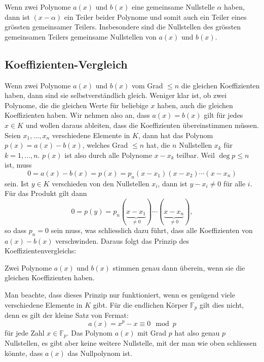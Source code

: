 Wenn zwei Polynome $a(x)$ und $b(x)$ eine gemeinsame Nullstelle $\alpha$
haben, dann ist $(x-\alpha)$ ein Teiler beider Polynome und somit auch
ein Teiler eines grössten gemeinsamer Teilers.
Insbesondere sind die Nullstellen des grössten gemeinsamen Teilers
gemeinsame Nullstellen von $a(x)$ und $b(x)$.

%
%
\subsection{Koeffizienten-Vergleich}
Wenn zwei Polynome $a(x)$ und $b(x)$ vom Grad $\le n$ die gleichen
Koeffizienten haben, dann sind sie selbstverständlich gleich.
Weniger klar ist, ob zwei Polynome, die die gleichen Werte für beliebige
$x$ haben, auch die gleichen Koeffizienten haben.
Wir nehmen also an, dass $a(x)=b(x)$ gilt für jedes $x\in K$ und
wollen daraus ableiten, dass die Koeffizienten übereinstimmen müssen.
Seien $x_1,\dots,x_n$ verschiedene Elemente in $K$, dann
hat das Polynom $p(x)=a(x)-b(x)$, welches Grad $\le n$ hat,
die $n$ Nullstellen $x_k$ für $k=1,\dots,n$.
$p(x)$ ist also durch alle Polynome $x-x_k$ teilbar.
Weil $\deg p\le n$ ist, muss 
\[
0
=
a(x)-b(x)
=
p(x)
=
p_n
(x-x_1)(x-x_2)\cdots (x-x_n)
\]
sein.
Ist $y\in K$ verschieden von den Nullstellen $x_i$, dann ist 
$y-x_i\ne 0$ für alle $i$.
Für das Produkt gilt dann
\[
0
=
p(y) 
=
p_n
(\underbrace{x-x_1}_{\displaystyle \ne 0})
\cdots
(\underbrace{x-x_n}_{\displaystyle \ne 0}),
\]
so dass $p_n=0$ sein muss, was schliesslich dazu führt, dass alle
Koeffizienten von $a(x)-b(x)$ verschwinden.
Daraus folgt das Prinzip des Koeffizientenvergleichs:
%
%

\begin{satz}[Koeffizientenvergleich]
%
\label{buch:polynome:satz:koeffizientenvergleich}
Zwei Polynome $a(x)$ und $b(x)$ stimmen genau dann überein, wenn
sie die gleichen Koeffizienten haben.
\end{satz}

Man beachte, dass dieses Prinzip nur funktioniert, wenn es genügend
viele verschiedene Elemente in $K$ gibt.
Für die endlichen Körper $\mathbb{F}_p$ gilt dies nicht, denn es gilt
der kleine Satz von Fermat:
%
%
\[
a(x)
=
x^p-x\equiv 0\mod p
\]
für jede Zahl $x\in\mathbb{F}_p$.
Das Polynom $a(x)$ mit Grad $p$
hat also genau $p$ Nullstellen, es gibt aber keine weitere Nullstelle,
mit der man wie oben schliessen könnte, dass $a(x)$ das Nullpolynom ist.


